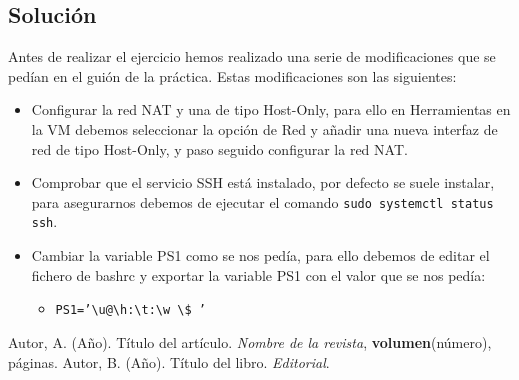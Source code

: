 \documentclass[a4paper,12pt]{article}
\begin{document}
\subsection{Solución}

Antes de realizar el ejercicio hemos realizado una serie de modificaciones que se pedían en el guión de la práctica. Estas modificaciones son las siguientes:
\begin{itemize}
    \item Configurar la red NAT y una de tipo Host-Only, para ello en Herramientas en la VM debemos seleccionar la opción de Red y añadir una nueva interfaz de red de tipo Host-Only, y paso seguido configurar la red NAT.
    \item Comprobar que el servicio SSH está instalado, por defecto se suele instalar, para asegurarnos debemos de ejecutar el comando \texttt{sudo systemctl status ssh}.
    \item Cambiar la variable PS1 como se nos pedía, para ello debemos de editar el fichero de bashrc y exportar la variable PS1 con el valor que se nos pedía:
    \begin{itemize}
        \item \texttt{PS1='\textbackslash u@\textbackslash h:\textbackslash t:\textbackslash w \textbackslash\$ '}
    \end{itemize}
\end{itemize}

\newpage
\begin{thebibliography}{9}
     Autor, A. (Año). Título del artículo. \textit{Nombre de la revista}, \textbf{volumen}(número), páginas.
     Autor, B. (Año). Título del libro. \textit{Editorial}.
\end{thebibliography}
\end{document}
